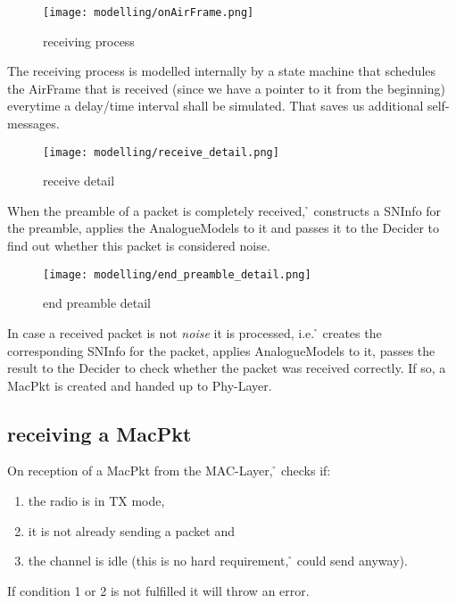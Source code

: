 \begin{figure}[H]
 \centering
 \texttt{[image: modelling/onAirFrame.png]}
 \caption{receiving process}
 \label{fig: receiving process}
\end{figure}

The receiving process is modelled internally by a state machine that schedules the
AirFrame that is received (since we have a pointer to it from the beginning) everytime
a delay/time interval shall be simulated. That saves us additional self-messages.


\begin{figure}[H]
 \centering
 \texttt{[image: modelling/receive\_detail.png]}
 \caption{receive detail}
 \label{fig: receive detail}
\end{figure}

When the preamble of a packet is completely received, \h{\bp} constructs a SNInfo
for the preamble, applies the AnalogueModels to it and passes it to the Decider to
find out whether this packet is considered noise.

\begin{figure}[H]
 \centering
 \texttt{[image: modelling/end\_preamble\_detail.png]}
 \caption{end preamble detail}
 \label{fig: end preamble detail}
\end{figure}

In case a received packet is not \textit{noise} it is processed, i.e. \h{\bp} creates the corresponding SNInfo for the packet, applies AnalogueModels to it, passes the result to the Decider to check whether the packet was received correctly. If so, a MacPkt is created and handed up to Phy-Layer.


\subsection{receiving a MacPkt}

On reception of a MacPkt from the MAC-Layer, \h{\bp} checks if:
\begin{enumerate}
	\item the radio is in TX mode,
	\item it is not already sending a packet and
	\item the channel is idle (this is no hard requirement, \h{\bp} could send anyway).
\end{enumerate} 

If condition 1 or 2 is not fulfilled it will throw an error.\\

